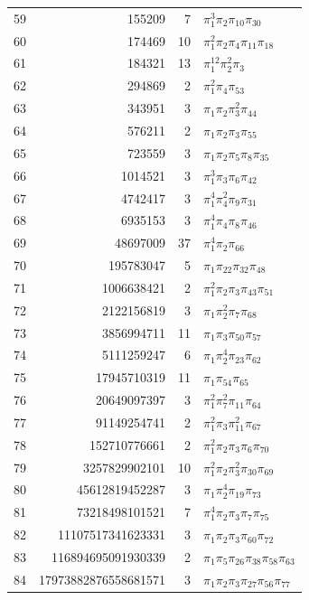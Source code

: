 \documentclass[11pt,a4paper]{article}
\theoremstyle{definition}
\theoremstyle{remark}
\numberwithin{equation}{section}
\begin{document}
{\begin{longtable}{r r r l}
59 & 155209 & 7 & $\pi_{1}^{3}\pi_{2}\pi_{10}\pi_{30}$ \\
60 & 174469 & 10 & $\pi_{1}^{2}\pi_{2}\pi_{4}\pi_{11}\pi_{18}$ \\
61 & 184321 & 13 & $\pi_{1}^{12}\pi_{2}^{2}\pi_{3}$ \\
62 & 294869 & 2 & $\pi_{1}^{2}\pi_{4}\pi_{53}$ \\
63 & 343951 & 3 & $\pi_{1}\pi_{2}\pi_{3}^{2}\pi_{44}$ \\
64 & 576211 & 2 & $\pi_{1}\pi_{2}\pi_{3}\pi_{55}$ \\
65 & 723559 & 3 & $\pi_{1}\pi_{2}\pi_{5}\pi_{8}\pi_{35}$ \\
66 & 1014521 & 3 & $\pi_{1}^{3}\pi_{3}\pi_{6}\pi_{42}$ \\
67 & 4742417 & 3 & $\pi_{1}^{4}\pi_{4}^{2}\pi_{9}\pi_{31}$ \\
68 & 6935153 & 3 & $\pi_{1}^{4}\pi_{4}\pi_{8}\pi_{46}$ \\
69 & 48697009 & 37 & $\pi_{1}^{4}\pi_{2}\pi_{66}$ \\
70 & 195783047 & 5 & $\pi_{1}\pi_{22}\pi_{32}\pi_{48}$ \\
71 & 1006638421 & 2 & $\pi_{1}^{2}\pi_{2}\pi_{3}\pi_{43}\pi_{51}$ \\
72 & 2122156819 & 3 & $\pi_{1}\pi_{2}^{2}\pi_{7}\pi_{68}$ \\
73 & 3856994711 & 11 & $\pi_{1}\pi_{3}\pi_{50}\pi_{57}$ \\
74 & 5111259247 & 6 & $\pi_{1}\pi_{2}^{4}\pi_{23}\pi_{62}$ \\
75 & 17945710319 & 11 & $\pi_{1}\pi_{54}\pi_{65}$ \\
76 & 20649097397 & 3 & $\pi_{1}^{2}\pi_{7}^{2}\pi_{11}\pi_{64}$ \\
77 & 91149254741 & 2 & $\pi_{1}^{2}\pi_{3}\pi_{11}^{2}\pi_{67}$ \\
78 & 152710776661 & 2 & $\pi_{1}^{2}\pi_{2}\pi_{3}\pi_{6}\pi_{70}$ \\
79 & 3257829902101 & 10 & $\pi_{1}^{2}\pi_{2}\pi_{3}^{2}\pi_{30}\pi_{69}$ \\
80 & 45612819452287 & 3 & $\pi_{1}\pi_{2}^{4}\pi_{19}\pi_{73}$ \\
81 & 73218498101521 & 7 & $\pi_{1}^{4}\pi_{2}\pi_{3}\pi_{7}\pi_{75}$ \\
82 & 11107517341623331 & 3 & $\pi_{1}\pi_{2}\pi_{3}\pi_{60}\pi_{72}$ \\
83 & 116894695091930339 & 2 & $\pi_{1}\pi_{5}\pi_{26}\pi_{38}\pi_{58}\pi_{63}$ \\
84 & 17973882876558681571 & 3 & $\pi_{1}\pi_{2}\pi_{3}\pi_{27}\pi_{56}\pi_{77}$ \\

\end{longtable}}
\end{document}
